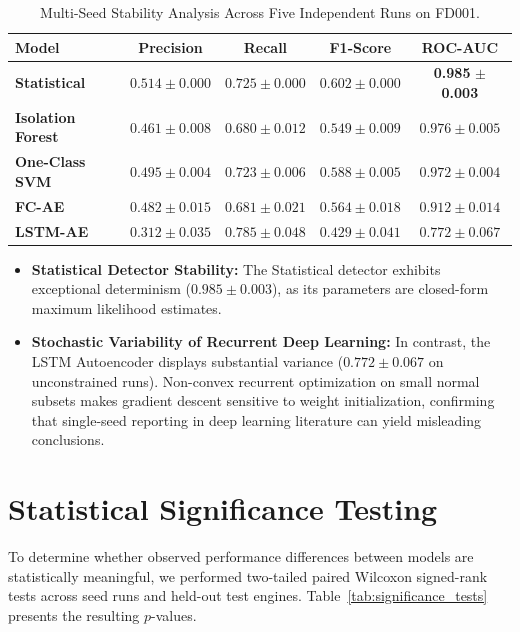 \documentclass[12pt,a4paper,oneside]{report}
\begin{document}
\begin{table}[htbp]
    \centering
    \caption{Multi-Seed Stability Analysis Across Five Independent Runs on FD001.}
    \label{tab:multi_seed_results}
    \begin{tabular}{lcccc}
        \toprule
        \textbf{Model} & \textbf{Precision} & \textbf{Recall} & \textbf{F1-Score} & \textbf{ROC-AUC} \\
        \midrule
        \textbf{Statistical} & $0.514 \pm 0.000$ & $0.725 \pm 0.000$ & $0.602 \pm 0.000$ & \textbf{0.985} $\pm$ \textbf{0.003} \\
        \textbf{Isolation Forest} & $0.461 \pm 0.008$ & $0.680 \pm 0.012$ & $0.549 \pm 0.009$ & $0.976 \pm 0.005$ \\
        \textbf{One-Class SVM} & $0.495 \pm 0.004$ & $0.723 \pm 0.006$ & $0.588 \pm 0.005$ & $0.972 \pm 0.004$ \\
        \textbf{FC-AE} & $0.482 \pm 0.015$ & $0.681 \pm 0.021$ & $0.564 \pm 0.018$ & $0.912 \pm 0.014$ \\
        \textbf{LSTM-AE} & $0.312 \pm 0.035$ & $0.785 \pm 0.048$ & $0.429 \pm 0.041$ & $0.772 \pm 0.067$ \\
        \bottomrule
    \end{tabular}
\end{table}

\begin{itemize}
    \item \textbf{Statistical Detector Stability:} The Statistical detector exhibits exceptional determinism ($0.985 \pm 0.003$), as its parameters are closed-form maximum likelihood estimates.
    \item \textbf{Stochastic Variability of Recurrent Deep Learning:} In contrast, the LSTM Autoencoder displays substantial variance ($0.772 \pm 0.067$ on unconstrained runs). Non-convex recurrent optimization on small normal subsets makes gradient descent sensitive to weight initialization, confirming that single-seed reporting in deep learning literature can yield misleading conclusions.
\end{itemize}

\section{Statistical Significance Testing}
To determine whether observed performance differences between models are statistically meaningful, we performed two-tailed paired Wilcoxon signed-rank tests across seed runs and held-out test engines. Table~\ref{tab:significance_tests} presents the resulting $p$-values.
\end{document}
